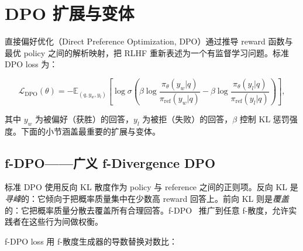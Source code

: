 \section{DPO 扩展与变体}
\label{sec:dpo-variants}

直接偏好优化（Direct Preference Optimization, DPO）通过推导 reward 函数与最优 policy 之间的解析映射，把 RLHF 重新表述为一个有监督学习问题。标准 DPO loss 为：

\[
\mathcal{L}_{\text{DPO}}(\theta) = -\mathbb{E}_{(q,y_w,y_l)}\!\left[
    \log \sigma\!\left(
      \beta \log \frac{\pi_\theta(y_w|q)}{\pi_{\text{ref}}(y_w|q)}
      - \beta \log \frac{\pi_\theta(y_l|q)}{\pi_{\text{ref}}(y_l|q)}
    \right)
  \right],
\]

其中 $y_w$ 为被偏好（获胜）的回答，$y_l$ 为被拒（失败）的回答，$\beta$ 控制 KL 惩罚强度。下面的小节涵盖最重要的扩展与变体。

\subsection{f-DPO——广义 f-Divergence DPO}
\label{sec:fdpo}

\begin{intuitionbox}[超越反向 KL]
标准 DPO 使用反向 KL 散度作为 policy 与 reference 之间的正则项。反向 KL 是\emph{寻峰}的：它倾向于把概率质量集中在少数高 reward 回答上。前向 KL 则是\emph{覆盖}的：它把概率质量分散去覆盖所有合理回答。f-DPO~\cite{wang2023fdpo} 推广到任意 f-散度，允许实践者在这些行为间做权衡。
\end{intuitionbox}

f-DPO loss 用 f-散度生成器的导数替换对数比：

